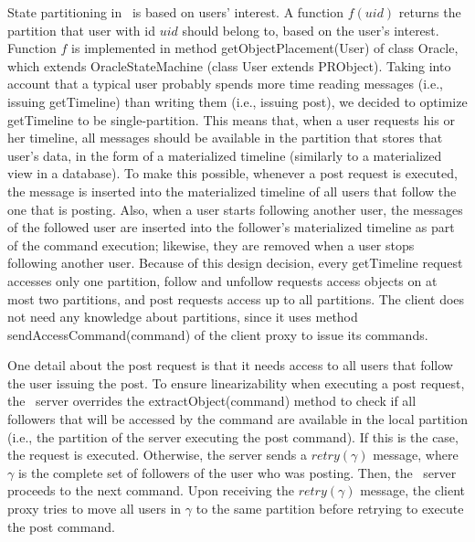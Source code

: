 State partitioning in \dssmrappname\ is based on users' interest. A function $f(uid)$
returns the partition that user with id $uid$ should belong to, based on the
user's interest. Function $f$ is implemented in method getObjectPlacement(User)
of class \dssmrappname{}Oracle, which extends OracleStateMachine (class User extends
PRObject). Taking into account that a typical user probably spends more time
reading messages (i.e., issuing getTimeline) than writing them (i.e., issuing
post), we decided to optimize getTimeline to be single-partition. This means
that, when a user requests his or her timeline, all messages should be available
in the partition that stores that user's data, in the form of a materialized
timeline (similarly to a materialized view in a database). To make this
possible, whenever a post request is executed, the message is inserted into the
materialized timeline of all users that follow the one that is posting. Also,
when a user starts following another user, the messages of the followed user are
inserted into the follower's materialized timeline as part of the command
execution; likewise, they are removed when a user stops following another user.
Because of this design decision, every getTimeline request accesses only one
partition, follow and unfollow requests access objects on at most two
partitions, and post requests access up to all partitions. The \dssmrappname{} client
does not need any knowledge about partitions, since it uses method
sendAccessCommand(command) of the \dssmr{} client proxy to issue its commands.

One detail about the post request is that it needs access to all users that
follow the user issuing the post.
To ensure linearizability when executing a post request, the \dssmrappname\ server
overrides the extractObject(command) method to check if all followers that will
be accessed by the command are available in the local partition (i.e., the
partition of the server executing the post command). If this is the case, the
request is executed. Otherwise, the server sends a $retry(\gamma)$ message,
where $\gamma$ is the complete set of followers of the user who was posting.
Then, the \dssmrappname\ server proceeds to the next command. Upon receiving the
$retry(\gamma)$ message, the client proxy tries to move all users in $\gamma$ to
the same partition before retrying to execute the post command.

